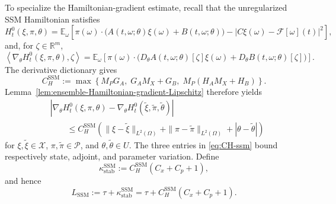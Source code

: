 \documentclass[11pt]{amsart}
\numberwithin{equation}{section} %
\theoremstyle{remark}
\begin{document}
To specialize the Hamiltonian-gradient estimate, recall that the unregularized SSM Hamiltonian satisfies
\begin{equation}
\label{eq:ssm-H0}
H_t^0(\xi,\pi,\theta)
=\mathbb E_\omega\!\left[
\pi(\omega)\cdot\bigl(A(t,\omega;\theta)\xi(\omega)
+B(t,\omega;\theta)\bigr)
-|C\xi(\omega)-\mathcal F[\omega](t)|^2
\right],
\end{equation}
and, for $\zeta\in\mathbb R^m$,
\begin{equation}
\label{eq:ssm-DuH0}
\left\langle\nabla_\theta H_t^0(\xi,\pi,\theta),\zeta\right\rangle
=\mathbb E_\omega\!\left[
\pi(\omega)\cdot\bigl(
D_\theta A(t,\omega;\theta)[\zeta]\xi(\omega)
+D_\theta B(t,\omega;\theta)[\zeta]\bigr)
\right].
\end{equation}
The derivative dictionary gives
\begin{equation}
\label{eq:CH-ssm}
C_H^{\mathrm{SSM}}
:=\max\left\{
M_PG_A,\;G_AM_X+G_B,\;M_P(H_AM_X+H_B)
\right\}.
\end{equation}
Lemma~\ref{lem:ensemble-Hamiltonian-gradient-Lipschitz} therefore yields
\begin{align}
\label{eq:ssm-H-gradient-Lipschitz}
&\left|\nabla_\theta H_t^0(\xi,\pi,\theta)
-\nabla_\theta H_t^0(\widetilde\xi,\widetilde\pi,\widetilde\theta)
\right|\nonumber\\
&\qquad\le C_H^{\mathrm{SSM}}\left(
\|\xi-\widetilde\xi\|_{L^2(\Omega)}
+\|\pi-\widetilde\pi\|_{L^2(\Omega)}
+|\theta-\widetilde\theta|\right)
\end{align}
for $\xi,\widetilde\xi\in\mathcal X$,
$\pi,\widetilde\pi\in\mathcal P$, and
$\theta,\widetilde\theta\in U$.  The three entries in
\eqref{eq:CH-ssm} bound respectively state, adjoint, and parameter
variation.  Define
\begin{equation}
\label{eq:kappa-stab-ssm}
\kappa_{\mathrm{stab}}^{\mathrm{SSM}}
:=C_H^{\mathrm{SSM}}(C_x+C_p+1),
\end{equation}
and hence
\begin{equation}
\label{eq:L-ssm}
L_{\mathrm{SSM}}
:=\tau+\kappa_{\mathrm{stab}}^{\mathrm{SSM}}
=\tau+C_H^{\mathrm{SSM}}(C_x+C_p+1).
\end{equation}
\end{document}
